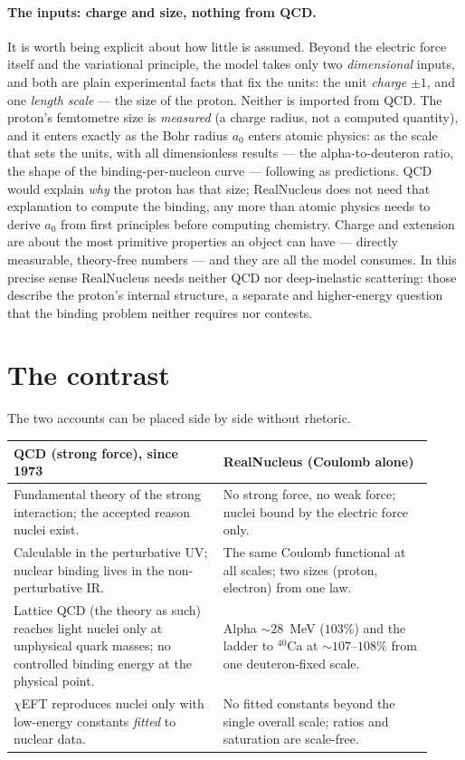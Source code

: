 \documentclass[11pt]{article}
\begin{document}
\paragraph{The inputs: charge and size, nothing from QCD.} It is worth being explicit about how little is
assumed. Beyond the electric force itself and the variational principle, the model takes only two
\emph{dimensional} inputs, and both are plain experimental facts that fix the units: the unit
\emph{charge} $\pm1$, and one \emph{length scale} --- the size of the proton. Neither is imported from
QCD. The proton's femtometre size is \emph{measured} (a charge radius, not a computed quantity), and it
enters exactly as the Bohr radius $a_0$ enters atomic physics: as the scale that sets the units, with all
dimensionless results --- the alpha-to-deuteron ratio, the shape of the binding-per-nucleon curve ---
following as predictions. QCD would explain \emph{why} the proton has that size; RealNucleus does not need
that explanation to compute the binding, any more than atomic physics needs to derive $a_0$ from first
principles before computing chemistry. Charge and extension are about the most primitive properties an
object can have --- directly measurable, theory-free numbers --- and they are all the model consumes. In
this precise sense RealNucleus needs neither QCD nor deep-inelastic scattering: those describe the
proton's internal structure, a separate and higher-energy question that the binding problem neither
requires nor contests.

\section{The contrast}
\label{sec:contrast}

The two accounts can be placed side by side without rhetoric.

\begin{center}
\begin{tabular}{@{}p{0.46\linewidth} p{0.46\linewidth}@{}}
\toprule
\textbf{QCD (strong force), since 1973} & \textbf{RealNucleus (Coulomb alone)} \\
\midrule
Fundamental theory of the strong interaction; the accepted reason nuclei exist. &
No strong force, no weak force; nuclei bound by the electric force only. \\[4pt]
Calculable in the perturbative UV; nuclear binding lives in the non-perturbative IR. &
The same Coulomb functional at all scales; two sizes (proton, electron) from one law. \\[4pt]
Lattice QCD (the theory as such) reaches light nuclei only at unphysical quark masses; no controlled
binding energy at the physical point. &
Alpha $\sim 28$~MeV ($103\%$) and the ladder to ${}^{40}$Ca at $\sim 107$--$108\%$ from one deuteron-fixed scale. \\[4pt]
$\chi$EFT reproduces nuclei only with low-energy constants \emph{fitted} to nuclear data. &
No fitted constants beyond the single overall scale; ratios and saturation are scale-free. \\
\bottomrule
\end{tabular}
\end{center}
\end{document}
